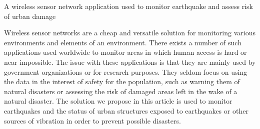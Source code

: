 A wireless sensor network application used to monitor earthquake and assess risk of urban damage

Wireless sensor networks are a cheap and versatile solution for monitoring various environments 
and elements of an environment. There exists a number of such applications used worldwide to monitor 
areas in which human access is hard or near impossible. The issue with these applications is that 
they are mainly used by government organizations or for research purposes. They seldom focus on 
using the data in the interest of safety for the population, such as warning them of natural 
disasters or assessing the risk of damaged areas left in the wake of a natural disaster. The 
solution we propose in this article is used to monitor earthquakes and the status of urban structures 
exposed to earthquakes or other sources of vibration in order to prevent possible disasters.
